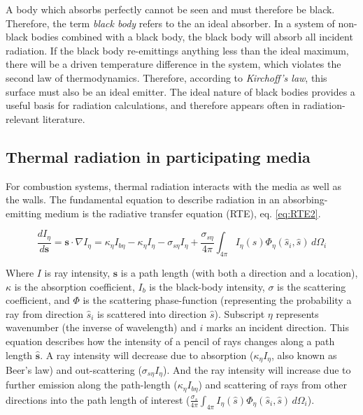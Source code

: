 A body which absorbs perfectly cannot be seen and must therefore be black. Therefore, the term \textit{black body} refers to the an ideal absorber. 
In a system of non-black bodies combined with a black body, the black body will absorb all incident radiation. If the black body re-emittings anything less than the ideal maximum, there will be a driven temperature difference in the system, which violates the second law of thermodynamics. 
Therefore, according to \textit{Kirchoff's law}, this surface must also be an ideal emitter.
The ideal nature of black bodies provides a useful basis for radiation calculations, and therefore appears often in radiation-relevant literature.

\subsection{Thermal radiation in participating media}
For combustion systems, thermal radiation interacts with the media as well as the walls. The fundamental equation to describe radiation in an absorbing-emitting medium is the radiative transfer equation (RTE), eq. \ref{eq:RTE2}.

\begin{equation}
    \frac{dI_\eta{}}{d\textbf{s}} = \textbf{s} \cdot \nabla{I_\eta{}} = \kappa{}_\eta{}I_{b\eta{}}-\kappa{}_\eta{}I_\eta{}-\sigma{}_{s\eta{}}I_\eta{}+\frac{\sigma{}_{s\eta{}}}{4\pi}\int_{4\pi{}}{I_\eta{}(\hat{s})\Phi_\eta{}(\hat{s}_i,\hat{s})}\,d\Omega{}_i
    \label{eq:RTE2}
\end{equation}

Where $I$ is ray intensity, $\textbf{s}$ is a path length (with both a direction and a location), $\kappa{}$ is the absorption coefficient, $I_b$ is the black-body intensity, $\sigma{}$ is the scattering coefficient, and $\Phi{}$ is the scattering phase-function (representing the probability a ray from direction $\hat{s}_i$ is scattered into direction $\hat{s}$). Subscript $\eta{}$ represents wavenumber (the inverse of wavelength) and $i$ marks an incident direction. This equation describes how the intensity of a pencil of rays changes along a path length $\hat{\textbf{s}}$. A ray intensity will decrease due to absorption ($\kappa{}_\eta{}I_\eta{}$, also known as Beer's law) and out-scattering ($\sigma{}_{s\eta{}}I_\eta{}$). And the ray intensity will increase due to further emission along the path-length ($\kappa{}_\eta{}I_{b\eta{}}$) and scattering of rays from other directions into the path length of interest ($\frac{\sigma{}_s}{4\pi}\int_{4\pi{}}{I_\eta{}(\hat{s})\Phi_\eta{}(\hat{s}_i,\hat{s})}\,d\Omega{}_i$). 

